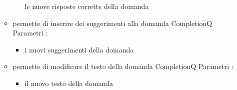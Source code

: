 \begin{itemize}
\begin{itemize}
\begin{itemize}
\newline
le nuove risposte corrette della domanda
\end{itemize}
\item {}
\newline
permette di inserire dei suggerimenti alla domanda CompletionQ
\newline
Parametri :
\begin{itemize}
\item {}
\newline
i nuovi suggerimenti della domanda
\end{itemize}
\item {}
\newline
permette di modificare il testo della domanda CompletionQ
\newline
Parametri :
\begin{itemize}
\item {}
\newline
il nuovo testo della domanda
\end{itemize}
\end{itemize}
\end{itemize}
